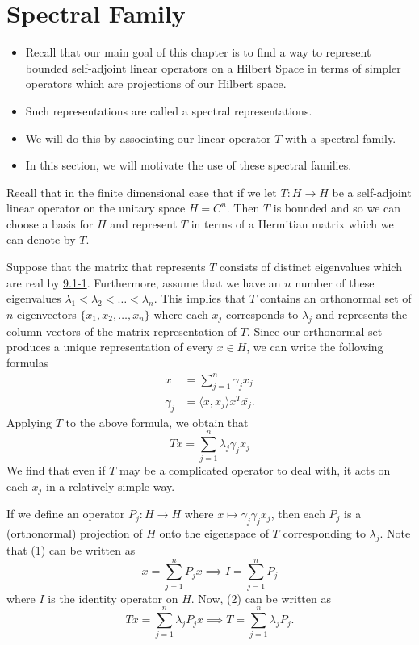 \section{Spectral Family}

\begin{itemize}
    \item Recall that our main goal of this chapter is to find a way to represent bounded self-adjoint linear operators on a Hilbert Space in terms of simpler operators which are projections of our Hilbert space. 
    \item Such representations are called a spectral representations.
    \item We will do this by associating our linear operator \( T  \) with a spectral family.    
    \item In this section, we will motivate the use of these spectral families.
\end{itemize}

Recall that in the finite dimensional case that if we let \( T: H \to H  \) be a self-adjoint linear operator on the unitary space \( H = C^{n} \). Then \( T  \) is bounded and so we can choose a basis for \( H  \) and represent \( T  \) in terms of a Hermitian matrix which we can denote by \( T  \).

Suppose that the matrix that represents \( T  \) consists of distinct eigenvalues which are real by {\hyperref[9.1-1]{9.1-1}}. Furthermore, assume that we have an \( n  \) number of these eigenvalues \( {\lambda}_{1} < {\lambda}_{2} < \dots < {\lambda}_{n} \). This implies that \( T  \) contains an orthonormal set of \( n  \) eigenvectors \( \{ {x}_{1}, {x}_{2}, \dots, {x}_{n} \}  \) 
where each \( {x}_{j }  \) corresponds to \( {\lambda}_{j} \) and represents the column vectors of the matrix representation of \( T  \). Since our orthonormal set produces a unique representation of every \( x \in H  \), we can write the following formulas
\begin{align*}
    x &= \sum_{ j=1  }^{ n } {\gamma}_{j} {x}_{j} \tag{1} \\ 
    {\gamma}_{j} &= \langle x , {x}_{j} \rangle x^{T} \overline{{x}_{j}}. 
\end{align*}
Applying \( T  \) to the above formula, we obtain that
\[  Tx = \sum_{ j=1  }^{ n } {\lambda}_{j} {\gamma}_{j} {x}_{j} \tag{2} \]
We find that even if \( T  \) may be a complicated operator to deal with, it acts on each \( {x}_{j} \) in a relatively simple way.

If we define an operator \( {P}_{j}: H \to H  \) where \( x \mapsto {\gamma}_{j} {\gamma}_{j} {x}_{j} \), then each \( {P}_{j} \) is a (orthonormal) projection of \( H  \) onto the eigenspace of \( T  \) corresponding to \( {\lambda}_{j} \). Note that (1) can be written as 
\[  x = \sum_{ j=1  }^{ n } {P}_{j} x \implies I = \sum_{ j=1  }^{ n } {P}_{j} \tag{3}  \] 
where \( I  \) is the identity operator on \( H  \). Now, (2) can be written as 
\[  Tx = \sum_{ j=1  }^{ n } {\lambda}_{j} {P}_{j}x \implies T = \sum_{ j=1  }^{ n } {\lambda}_{j} {P}_{j}. \tag{4} \]

